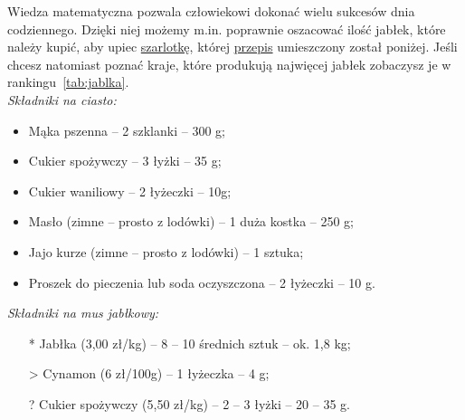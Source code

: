Wiedza matematyczna pozwala człowiekowi dokonać wielu sukcesów dnia codziennego. Dzięki niej możemy m.in. poprawnie oszacować ilość jabłek, które należy kupić, aby upiec \underline{szarlotkę}, której \href{https://uczymyjakslodzic.pl/szarlotka-prosty-przepis-na-deser-idealny/#Prosta_szarlotka_na_kruchym_ciescie_-_nasz_sprawdzony_przepis}{przepis} umieszczony został poniżej. Jeśli chcesz natomiast poznać kraje, które produkują najwięcej jabłek zobaczysz je w rankingu~\ref{tab:jablka}.\\
\emph{Składniki na ciasto:}
\begin{itemize}
    \item Mąka pszenna – 2 szklanki – 300 g;
    \item Cukier spożywczy – 3 łyżki – 35 g;
    \item Cukier waniliowy – 2 łyżeczki – 10g;
    \item Masło (zimne – prosto z lodówki) – 1 duża kostka – 250 g;
    \item Jajo kurze (zimne – prosto z lodówki) – 1 sztuka;
    \item Proszek do pieczenia lub soda oczyszczona – 2 łyżeczki – 10 g.
\end{itemize}
\emph{Składniki na mus jabłkowy:}
\begin{itemize}
    \item[*] Jabłka (3,00 zł/kg) – 8 – 10 średnich sztuk – ok. 1,8 kg;
    \item[>] Cynamon (6 zł/100g) – 1 łyżeczka – 4 g;
    \item[?] Cukier spożywczy (5,50 zł/kg) – 2 – 3 łyżki – 20 – 35 g.
\end{itemize}

